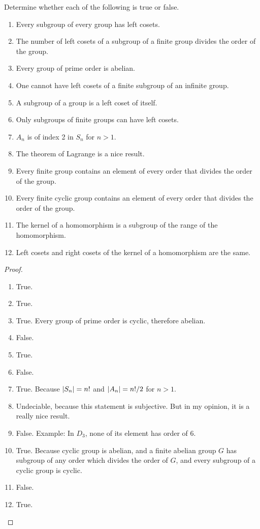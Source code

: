 \begin{exercise}
    Determine whether each of the following is true or false.
    \begin{enumerate}[label={\textbf{\alph*.}}]
        \item Every subgroup of every group has left cosets.
        \item The number of left cosets of a subgroup of a finite group divides the order of the group.
        \item Every group of prime order is abelian.
        \item One cannot have left cosets of a finite subgroup of an infinite group.
        \item A subgroup of a group is a left coset of itself.
        \item Only subgroups of finite groups can have left cosets.
        \item $A_{n}$ is of index 2 in $S_{n}$ for $n > 1$.
        \item The theorem of Lagrange is a nice result.
        \item Every finite group contains an element of every order that divides the order of the group.
        \item Every finite cyclic group contains an element of every order that divides the order of the group.
        \item The kernel of a homomorphism is a subgroup of the range of the homomorphism.
        \item Left cosets and right cosets of the kernel of a homomorphism are the same.
    \end{enumerate}
\end{exercise}

\begin{proof}
    \begin{enumerate}[label={\textbf{\alph*.}}]
        \item True.
        \item True.
        \item True. Every group of prime order is cyclic, therefore abelian.
        \item False.
        \item True.
        \item False.
        \item True. Because $\left\vert{S_{n}}\right\vert = n!{}$ and $\left\vert{A_{n}}\right\vert = n!/2$ for $n > 1$.
        \item Undeciable, because this statement is subjective. But in my opinion, it is a really nice result.
        \item False. Example: In $D_{3}$, none of its element has order of 6.
        \item True. Because cyclic group is abelian, and a finite abelian group $G$ has subgroup of any order which divides the order of $G$, and every subgroup of a cyclic group is cyclic.
        \item False.
        \item True.
    \end{enumerate}
\end{proof}

